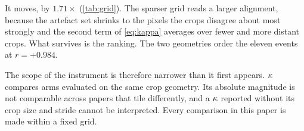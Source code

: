 It moves, by $1.71\times$ (\cref{tab:grid}). The sparser grid reads a larger
alignment, because the artefact set shrinks to the pixels the crops disagree about
most strongly and the second term of \cref{eq:kappa} averages over fewer and more
distant crops. What survives is the ranking. The two geometries order the eleven
events at $r = +0.984$.

The scope of the instrument is therefore narrower than it first appears. $\kappa$
compares arms evaluated on the same crop geometry. Its absolute magnitude is not comparable across papers that tile
differently, and a $\kappa$ reported without its crop size and stride cannot be
interpreted. Every comparison in this paper is made within a fixed grid.
